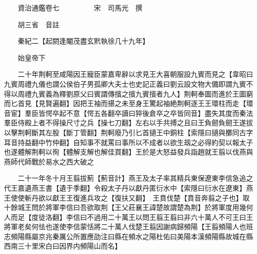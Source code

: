 










 


 
 


 

  
  
  
  
  





  
  
  
  
  
 
  

  

  
  
  



  

 
 

  
   




  

  
  


  　　資治通鑑卷七　　　　　宋　司馬光　撰

　　胡三省　音註

　　秦紀二【起閼逢閹茂盡玄黓執徐几十九年】

　　始皇帝下

　　二十年荆軻至咸陽因王寵臣蒙嘉卑辭以求見王大喜朝服設九賓而見之【韋昭曰九賓周禮九儀也謂公侯伯子男孤卿大夫士也史記正義曰劉云設文物大備即謂九賓不得以周禮九賓義為釋劉原父曰賓謂傳擯之擯九賓擯者九人】荆軻奉圖而進於王圖窮而匕首見【見賢遍翻】因把王袖而揕之未至身王驚起袖絶荆軻逐王王環柱而走【環音宦】羣臣皆愕卒起不意【愕五各翻卒讀曰猝後倉卒之卒皆同音】盡失其度而秦法羣臣侍殿上者不得操尺寸之兵【操七刀翻】左右以手共搏之且曰王負劒負劒王遂拔以擊荆軻斷其左股【斷丁管翻】荆軻廢乃引匕首擿王中銅柱【索隱曰擿與擲同古字耳音持益翻中竹仲翻】自知事不就罵曰事所以不成者以欲生刼之必得約契以報太子也遂體解荆軻以徇【體解支解也解佳買翻】王於是大怒益發兵詣趙就王翦以伐燕與燕師代師戰於易水之西大破之

　　二十一年冬十月王翦拔薊【薊音計】燕王及太子率其精兵東保遼東李信急追之代王嘉遺燕王書【遺于季翻】令殺太子丹以獻丹匿衍水中【索隱曰衍水在遼東】燕王使使斬丹欲以獻王王復進兵攻之【復扶又翻】　王賁伐楚【賁音奔翦之子也】取十餘城王問於將軍李信曰吾欲取荆【王父莊襄王諱楚故謂楚為荆】於將軍度用幾何人而足【度徒洛翻】李信曰不過用二十萬王以問王翦王翦曰非六十萬人不可王曰王將軍老矣何怯也遂使李信蒙恬將二十萬人伐楚王翦因謝病歸頻陽【王翦頻陽人也班志頻陽縣屬京兆秦厲公所置應劭注曰縣在頻水之陽杜佑曰美陽本漢頻陽縣故城在縣西南三十里宋白曰因界内頻陽山而名】

